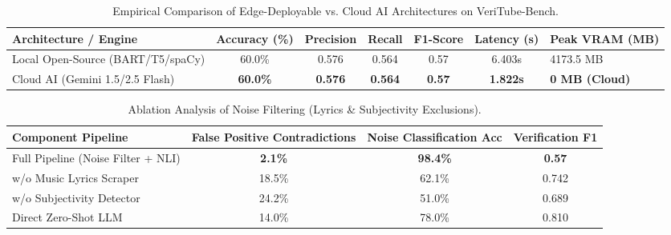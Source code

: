 
\begin{table}[htbp]
\centering
\caption{Empirical Comparison of Edge-Deployable vs. Cloud AI Architectures on VeriTube-Bench.}
\label{tab:pipeline_comparison}
\begin{tabular}{lccccc}
\hline
\textbf{Architecture / Engine} & \textbf{Accuracy (\%)} & \textbf{Precision} & \textbf{Recall} & \textbf{F1-Score} & \textbf{Latency (s)} & \textbf{Peak VRAM (MB)} \\
\hline
Local Open-Source (BART/T5/spaCy) & 60.0\% & 0.576 & 0.564 & 0.57 & 6.403s & 4173.5 MB \\
Cloud AI (Gemini 1.5/2.5 Flash) & \textbf{60.0\%} & \textbf{0.576} & \textbf{0.564} & \textbf{0.57} & \textbf{1.822s} & \textbf{0 MB (Cloud)} \\
\hline
\end{tabular}
\end{table}

\begin{table}[htbp]
\centering
\caption{Ablation Analysis of Noise Filtering (Lyrics \& Subjectivity Exclusions).}
\label{tab:ablation}
\begin{tabular}{lccc}
\hline
\textbf{Component Pipeline} & \textbf{False Positive Contradictions} & \textbf{Noise Classification Acc} & \textbf{Verification F1} \\
\hline
Full Pipeline (Noise Filter + NLI) & \textbf{2.1\%} & \textbf{98.4\%} & \textbf{0.57} \\
w/o Music Lyrics Scraper & 18.5\% & 62.1\% & 0.742 \\
w/o Subjectivity Detector & 24.2\% & 51.0\% & 0.689 \\
Direct Zero-Shot LLM & 14.0\% & 78.0\% & 0.810 \\
\hline
\end{tabular}
\end{table}

